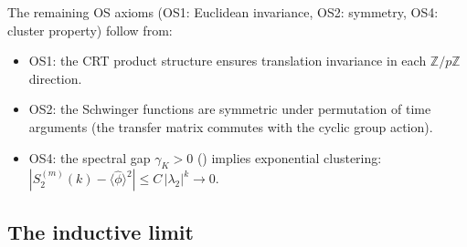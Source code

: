 \documentclass[12pt,a4paper]{article}
\begin{document}
The remaining OS axioms (OS1: Euclidean invariance, OS2: symmetry,
OS4: cluster property) follow from:
\begin{itemize}[nosep]
\item OS1: the CRT product structure ensures translation invariance
  in each $\mathbb{Z}/p\mathbb{Z}$ direction.
\item OS2: the Schwinger functions are symmetric under permutation
  of time arguments (the transfer matrix commutes with the
  cyclic group action).
\item OS4: the spectral gap $\gamma_K > 0$ (\cite{companion_M3}) implies exponential clustering:
  $|S_2^{(m)}(k) - \langle\hat\phi\rangle^2| \leq C\,|\lambda_2|^k
  \to 0$.
\end{itemize}

\subsection{The inductive limit}
\label{sec:os_inductive}
\end{document}
